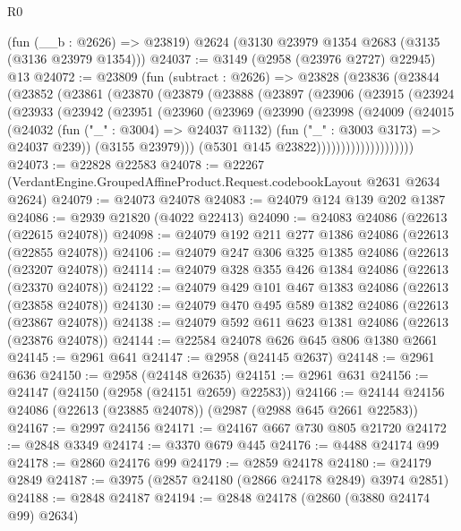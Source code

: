 \begin{lexlean}{R0}
\begin{coremodule}
    (fun (__b : @2626) => @23819)
    @2624
    (@3130 @23979 @1354 @2683 (@3135 (@3136 @23979 @1354)))
@24037 := @3149 (@2958 (@23976 @2727) @22945) @13
@24072 := @23809
    (fun (subtract : @2626) =>
    @23828
      (@23836
        (@23844
          (@23852
            (@23861
              (@23870
                (@23879
                  (@23888
                    (@23897
                      (@23906
                        (@23915
                          (@23924
                            (@23933
                              (@23942
                                (@23951
                                  (@23960
                                    (@23969
                                      (@23990
                                        (@23998
                                          (@24009
                                            (@24015
                                              (@24032
                                                (fun ("_" : @3004) => @24037 @1132)
                                                (fun ("_" : @3003 @3173) => @24037 @239))
                                              (@3155 @23979)))
                                          (@5301 @145 @23822))))))))))))))))))))
@24073 := @22828 @22583
@24078 := @22267 (VerdantEngine.GroupedAffineProduct.Request.codebookLayout @2631 @2634 @2624)
@24079 := @24073 @24078
@24083 := @24079 @124 @139 @202 @1387
@24086 := @2939 @21820 (@4022 @22413)
@24090 := @24083 @24086 (@22613 (@22615 @24078))
@24098 := @24079 @192 @211 @277 @1386 @24086 (@22613 (@22855 @24078))
@24106 := @24079 @247 @306 @325 @1385 @24086 (@22613 (@23207 @24078))
@24114 := @24079 @328 @355 @426 @1384 @24086 (@22613 (@23370 @24078))
@24122 := @24079 @429 @101 @467 @1383 @24086 (@22613 (@23858 @24078))
@24130 := @24079 @470 @495 @589 @1382 @24086 (@22613 (@23867 @24078))
@24138 := @24079 @592 @611 @623 @1381 @24086 (@22613 (@23876 @24078))
@24144 := @22584 @24078 @626 @645 @806 @1380 @2661
@24145 := @2961 @641
@24147 := @2958 (@24145 @2637)
@24148 := @2961 @636
@24150 := @2958 (@24148 @2635)
@24151 := @2961 @631
@24156 := @24147 (@24150 (@2958 (@24151 @2659) @22583))
@24166 := @24144 @24156 @24086 (@22613 (@23885 @24078)) (@2987 (@2988 @645 @2661 @22583))
@24167 := @2997 @24156
@24171 := @24167 @667 @730 @805 @21720
@24172 := @2848 @3349
@24174 := @3370 @679 @445
@24176 := @4488 @24174 @99
@24178 := @2860 @24176 @99
@24179 := @2859 @24178
@24180 := @24179 @2849
@24187 := @3975 (@2857 @24180 (@2866 @24178 @2849) @3974 @2851)
@24188 := @2848 @24187
@24194 := @2848 @24178 (@2860 (@3880 @24174 @99) @2634)

\end{coremodule}
\end{lexlean}
